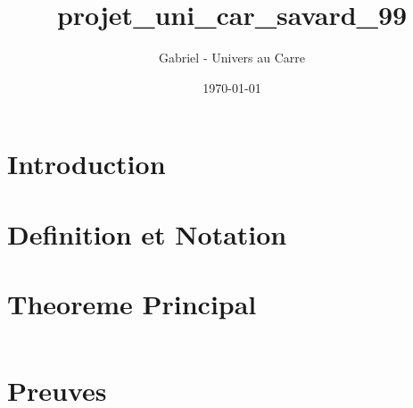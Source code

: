 \documentclass[12pt]{article}
\title{projet_uni_car_savard_99}
\author{Gabriel - Univers au Carre}
\date{\today}
\begin{document}
\maketitle


\section{Introduction}



\section{Definition et Notation}



\section{Theoreme Principal}


\begin{equation}
\end{equation}


\section{Preuves}


\end{document}
